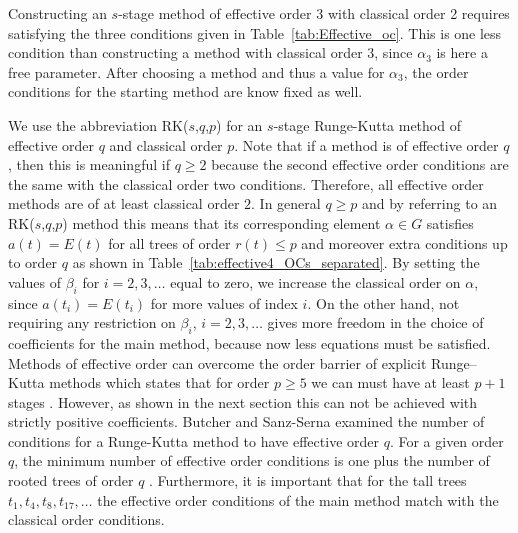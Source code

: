 \begin{example}\label{ex:Effective_RK32}
	Constructing an $s$-stage method of effective order 3 with classical order 2 requires satisfying the three conditions given in Table~\ref{tab:Effective_oc}. This is one less condition than constructing a method with classical order 3, since $\alpha_3$ is here a free parameter. After choosing a method and thus a value for $\alpha_3$, the order conditions for the starting method are know fixed as well.
\end{example}

We use the abbreviation RK($s$,$q$,$p$) for an $s$-stage Runge-Kutta method of effective order $q$ and classical order $p$. Note that if a method is of effective order $q$, then this is meaningful if $q \geq 2$ because the second effective order conditions are the same with the classical order two conditions. Therefore, all effective order methods are of at least classical order $2$. In general $q \geq p$ and by referring to an RK($s$,$q$,$p$) method this means that its corresponding element $\alpha \in G$ satisfies $a(t) = E(t)$ for all trees of order $r(t) \leq p$ and moreover extra conditions up to order $q$ as shown in Table~\ref{tab:effective4_OCs_separated}. By setting the values of $\beta_{i}$ for $i = 2, 3, \dots$ equal to zero, we increase the classical order on $\alpha$, since $a(t_{i}) = E(t_{i})$ for more values of index $i$. On the other hand, not requiring any restriction on $\beta_{i}$, $i = 2, 3, \dots$ gives more freedom in the choice of coefficients for the main method, because now less equations must be satisfied. Methods of effective order can overcome the order barrier of explicit Runge--Kutta methods which states that for order $p \ge 5$ we can must have at least $p+1$ stages \cite{Butcher1998}. However, as shown in the next section this can not be achieved with strictly positive coefficients.    
Butcher and Sanz-Serna examined the number of conditions for a Runge-Kutta method to have effective order $q$. For a given order $q$, the minimum number of effective order conditions is one plus the number of rooted trees of order $q$ \cite{Butcher1996}. Furthermore, it is important that for the tall trees $t_1, t_4, t_8, t_{17}, \dots$ the effective order conditions of the main method match with the classical order conditions.



